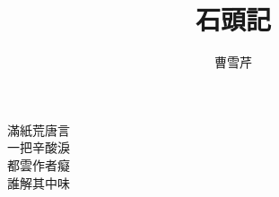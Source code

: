 \documentclass[12pt]{article}
\title{石頭記}
\author{曹雪芹}
\date{}
\begin{document}
\maketitle

\begin{center}
滿紙荒唐言\\
一把辛酸淚\\
都雲作者癡\\
誰解其中味\\
\end{center}
\end{document}
